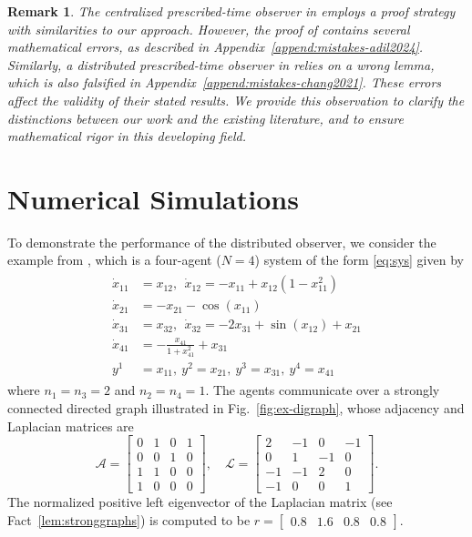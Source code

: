 \documentclass[journal]{IEEEtran}
\newtheorem{remark}{Remark}
\begin{document}
\begin{remark}
The centralized prescribed-time observer in \cite{Adil2024} employs a proof strategy with similarities to our approach. 
However, the proof of \cite[Theorem 1]{Adil2024} contains several mathematical errors, as described in Appendix~\ref{append:mistakes-adil2024}. 
Similarly, a distributed prescribed-time observer in \cite{Chang2021} relies on a wrong lemma, which is also falsified in Appendix~\ref{append:mistakes-chang2021}.
These errors affect the validity of their stated results. 
We provide this observation to clarify the distinctions between our work and the existing literature, and to ensure mathematical rigor in this developing field.
\end{remark}




\section{Numerical Simulations}

To demonstrate the performance of the distributed observer, we consider the example from \cite{Yuanqing22}, which is a four-agent ($N =4$) system of the form \eqref{eq:sys} given by
\begin{align}\label{eq:examplesys}
\begin{aligned}
    \dot x_{11} & = x_{12}, ~~
    \dot x_{12} = -x_{11}+x_{12}(1-x^2_{11})\\
    \dot x_{21} & = -x_{21}-\cos(x_{11})\\
    \dot x_{31} & = x_{32}, ~~
    \dot x_{32} = -2x_{31} + \sin(x_{12})+x_{21}\\
   \dot x_{41}  & = - \frac{x_{41}}{1+x^{2}_{41}}+x_{31}\\
        y^{1}   &= x_{11}, ~ 
        y^{2}   = x_{21},~  
        y^{3}   = x_{31}, ~ 
        y^{4}     = x_{41}
   \end{aligned}
\end{align}
where $n_1 = n_3 = 2$ and $n_2 = n_4 = 1$.
The agents communicate over a strongly connected directed graph illustrated in Fig.~\ref{fig:ex-digraph}, whose adjacency and Laplacian matrices are
\begin{equation*}
\mathcal{A} =
\begin{bmatrix}
0 & 1 & 0 & 1\\
0 & 0 & 1 & 0\\
1 & 1 & 0 & 0\\
1 & 0 & 0 & 0
\end{bmatrix}, \quad
    \mathcal{L} =
    \begin{bmatrix}
        2 & -1 & 0 & -1\\
        0 & 1 & -1 & 0\\
        -1 & -1 & 2 & 0\\
        -1 & 0 & 0 & 1
    \end{bmatrix}.
\end{equation*}
The normalized positive left eigenvector of the Laplacian matrix (see Fact~\ref{lem:stronggraphs}) is computed to be $r= \begin{bmatrix}
    0.8 & 1.6 & 0.8 & 0.8
\end{bmatrix}$.
\end{document}
